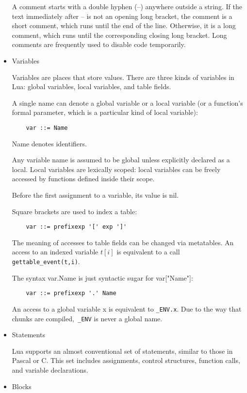 \begin{itemize}
A comment starts with a double hyphen (--) anywhere outside a string. If the text immediately after -- is not an opening long bracket, the comment is a short comment, which runs until the end of the line. Otherwise, it is a long comment, which runs until the corresponding closing long bracket. Long comments are frequently used to disable code temporarily.

\item  Variables

Variables are places that store values. There are three kinds of variables in Lua: global variables, local variables, and table fields.

A single name can denote a global variable or a local variable (or a function's formal parameter, which is a particular kind of local variable):
\begin{lstlisting}
	var ::= Name
\end{lstlisting}
Name denotes identifiers.

Any variable name is assumed to be global unless explicitly declared as a local. Local variables are lexically scoped: local variables can be freely accessed by functions defined inside their scope.

Before the first assignment to a variable, its value is nil.

Square brackets are used to index a table:
\begin{lstlisting}
	var ::= prefixexp '[' exp ']'
\end{lstlisting}

The meaning of accesses to table fields can be changed via metatables. An access to an indexed variable $t[i]$ is equivalent to a call \verb=gettable_event(t,i)=. 

The syntax var.Name is just syntactic sugar for var["Name"]:
\begin{lstlisting}
	var ::= prefixexp '.' Name
\end{lstlisting}
An access to a global variable x is equivalent to \verb=_ENV.x=. Due to the way that chunks are compiled,\verb= _ENV= is never a global name.

\item Statements

Lua supports an almost conventional set of statements, similar to those in Pascal or C. This set includes assignments, control structures, function calls, and variable declarations.

\item Blocks


\end{itemize}
